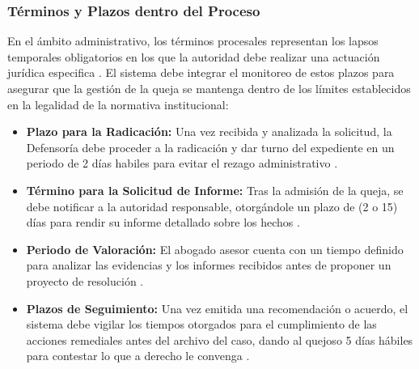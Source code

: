 \documentclass[12pt, letterpaper]{article}
\begin{document}
\subsubsection{Términos y Plazos dentro del Proceso}
En el ámbito administrativo, los términos procesales representan los lapsos temporales obligatorios en los que la autoridad debe realizar una actuación jurídica especifica \cite{ipn_manual_procedimientos}. El sistema debe integrar el monitoreo de estos plazos para asegurar que la gestión de la queja se mantenga dentro de los límites establecidos en la legalidad de la normativa institucional:
\\
\begin{itemize}
    \item \textbf{Plazo para la Radicación:} Una vez recibida y analizada la solicitud, la Defensoría debe proceder a la radicación y dar turno del expediente en un periodo de 2 días habiles para evitar el rezago administrativo \cite{ipn_manual_procedimientos}.
    \item \textbf{Término para la Solicitud de Informe:} Tras la admisión de la queja, se debe notificar a la autoridad responsable, otorgándole un plazo de (2 o 15) días para rendir su informe detallado sobre los hechos \cite{ipn_manual_procedimientos}.
    \item \textbf{Periodo de Valoración:} El abogado asesor cuenta con un tiempo definido para analizar las evidencias y los informes recibidos antes de proponer un proyecto de resolución \cite{ipn_manual_procedimientos}.
    \item \textbf{Plazos de Seguimiento:} Una vez emitida una recomendación o acuerdo, el sistema debe vigilar los tiempos otorgados para el cumplimiento de las acciones remediales antes del archivo del caso, dando al quejoso 5 días hábiles para contestar lo que a derecho le convenga \cite{ipn_manual_procedimientos}.
\end{itemize}
\end{document}
